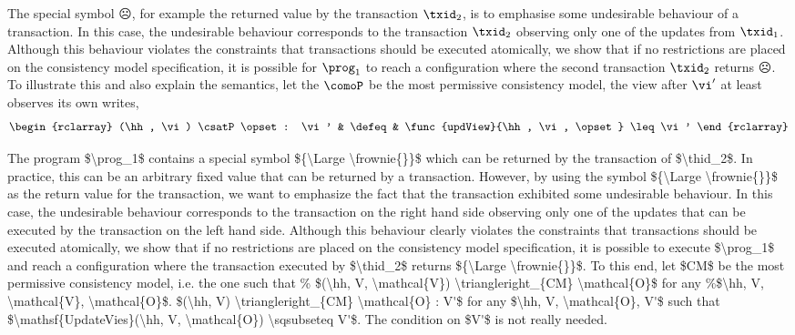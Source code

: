 The special symbol \(\sadface\), for example the returned value by the transaction $\txid_2$, is to emphasise some undesirable behaviour of a transaction.
In this case, the undesirable behaviour corresponds to the transaction \( \txid_{2} \) observing only one of the updates from \( \txid_{1} \). 
Although this behaviour violates the constraints that transactions should be executed atomically, we show that if no restrictions are placed on the consistency model specification, it is possible for $\prog_1$ to reach a configuration where the second transaction $\txid_2$ returns $\sadface$. 
To illustrate this and also explain the semantics, let the \( \comoP\) be the most permissive consistency model, \ie the view after \( \vi' \) at least observes its own writes,
\[
\begin{rclarray}
    (\hh, \vi) \csatP \opset : \vi' & \defeq & \func{updView}{\hh, \vi, \opset} \leq \vi'
\end{rclarray}
\]


\ac{
The program $\prog_1$ contains a special symbol ${\Large \frownie{}}$ which can be 
returned by the transaction of $\thid_2$. 
In practice, this can be an arbitrary fixed value that can be returned by a transaction. 
However, by using the symbol ${\Large \frownie{}}$ as the return value for the transaction, 
we want to emphasize the fact that the transaction exhibited some undesirable behaviour. 
In 
this case, the undesirable behaviour corresponds to the transaction on the right hand side 
observing only one of the updates that can be executed by the transaction on the left hand side. 

Although this behaviour clearly violates the constraints that transactions should be executed atomically, 
we show that if no restrictions are placed on the consistency model specification, 
it is possible to execute $\prog_1$ and reach a configuration where the transaction executed by 
$\thid_2$ returns ${\Large \frownie{}}$. To this end, let $CM$ be the most permissive 
consistency model, i.e. the one such that
$(\hh, V) \triangleright_{CM} \mathcal{O} : V'$ for any $\hh, V, \mathcal{O}, V'$ 
such that $\mathsf{UpdateVies}(\hh, V, \mathcal{O}) \sqsubseteq V'$.
}
\ac{The condition on $V'$ is not really needed.}

